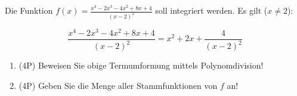 Die Funktion $f(x)=\frac{x^4-2x^3-4x^2+8x+4}{(x-2)^2}$ soll integriert werden. Es gilt ($x\ne 2$):

$$
	\frac{x^4-2x^3-4x^2+8x+4}{(x-2)^2} = x^2+2x+\frac{4}{(x-2)^2}
$$

\begin{enumerate}[label=(\alph*)]
		\item (4P) Beweisen Sie obige Termumformung mittels Polynomdivision!
			\bigskip
			\bigskip
			\bigskip
			\bigskip
			\bigskip
			\bigskip
			\bigskip
			\bigskip
			\bigskip
			\bigskip
			\bigskip

		\item (4P) Geben Sie die Menge aller Stammfunktionen von $f$ an!
\end{enumerate}